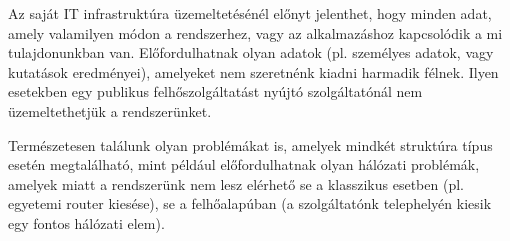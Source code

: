 Az saját IT infrastruktúra üzemeltetésénél előnyt jelenthet, hogy minden adat, amely valamilyen módon a rendszerhez, vagy az alkalmazáshoz kapcsolódik a mi tulajdonunkban van. Előfordulhatnak olyan adatok (pl. személyes adatok, vagy kutatások eredményei), amelyeket nem szeretnénk kiadni harmadik félnek. Ilyen esetekben egy publikus felhőszolgáltatást nyújtó szolgáltatónál nem üzemeltethetjük a rendszerünket.

Természetesen találunk olyan problémákat is, amelyek mindkét struktúra típus esetén megtalálható, mint például előfordulhatnak olyan hálózati problémák, amelyek miatt a rendszerünk nem lesz elérhető se a klasszikus esetben (pl. egyetemi router kiesése), se a felhőalapúban (a szolgáltatónk telephelyén kiesik egy fontos hálózati elem).

